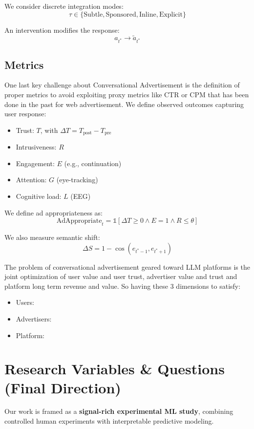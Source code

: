 \documentclass{article}
\begin{document}
We consider discrete integration modes:
\[
\tau \in \{\text{Subtle}, \text{Sponsored}, \text{Inline}, \text{Explicit}\}
\]

An intervention modifies the response:
\[
a_{t^*} \rightarrow \tilde{a}_{t^*}
\]

\subsection{Metrics}

One last key challenge about Conversational Advertisement is the definition of proper metrics to avoid exploiting proxy metrics like CTR or CPM that has been done in the past for web advertisement. We define observed outcomes capturing user response:

\begin{itemize}
    \item Trust: $T$, with $\Delta T = T_{\text{post}} - T_{\text{pre}}$
    \item Intrusiveness: $R$
    \item Engagement: $E$ (e.g., continuation)
    \item Attention: $G$ (eye-tracking)
    \item Cognitive load: $L$ (EEG)
\end{itemize}

We define ad appropriateness as:
\[
\text{AdAppropriate}_t = \mathbb{1}[\Delta T \geq 0 \wedge E = 1 \wedge R \leq \theta]
\]

We also measure semantic shift:
\[
\Delta S = 1 - \cos(e_{t^*-1}, e_{t^*+1})
\]

The problem of conversational advertisement geared toward LLM platforms is the joint optimization of user value and user trust, advertiser value and trust and platform long term revenue and value. So having these 3 dimensions to satisfy: 

\begin{itemize}
    \item Users:
    \item Advertisers:
    \item Platform:
\end{itemize}

\newpage

\section{Research Variables \& Questions (Final Direction)}

Our work is framed as a \textbf{signal-rich experimental ML study}, combining controlled human experiments with interpretable predictive modeling.
\end{document}
